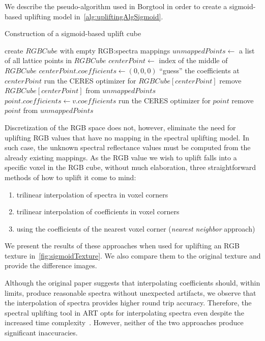 We describe the pseudo-algorithm used in Borgtool in order to create a sigmoid-based uplifting model in~\cref{alg:upliftingAlgSigmoid}.

\begin{algorithm}[t!]
	\caption{Construction of a sigmoid-based uplift cube}
	\label{alg:upliftingAlgSigmoid}
	\begin{algorithmic}[1]
		\State create $RGBCube$ with empty RGB:spectra mappings
		\State $unmappedPoints \gets$ a list of all lattice points in $RGBCube$
		\State $centerPoint \gets$ index of the middle of $RGBCube$
		\Statex {}
		\State $centerPoint.coefficients \gets (0,0,0)$
		\Statex \Comment ``guess'' the coefficients at $centerPoint$
		\State run the CERES optimizer for $RGBCube[centerPoint]$
		\State remove $RGBCube[centerPoint]$ from $unmappedPoints$
		\State $point.coefficients \gets v.coefficients$
		\State run the CERES optimizer for $point$
		\State remove $point$ from $unmappedPoints$
		\EndIf
		\EndIf
		\EndFor
		\EndWhile
	\end{algorithmic}
\end{algorithm}

Discretization of the RGB space does not, however, eliminate the need for uplifting RGB values that have no mapping in the spectral uplifting model. In such case, the unknown spectral reflectance values must be computed from the already existing mappings. As the RGB value we wish to uplift falls into a specific voxel in the RGB cube, without much elaboration, three straightforward methods of how to uplift it come to mind:
\begin{enumerate}
	\item trilinear interpolation of spectra in voxel corners
	\item trilinear interpolation of coefficients in voxel corners
	\item using the coefficients of the nearest voxel corner (\emph{nearest neighbor} approach)
\end{enumerate}

We present the results of these approaches when used for uplifting an RGB texture in~\cref{fig:sigmoidTexture}. We also compare them to the original texture and provide the difference images.

Although the original paper suggests that interpolating coefficients should, within limits, produce reasonable spectra without unexpected artifacts, we observe that the interpolation of spectra provides higher round trip accuracy. Therefore, the spectral uplifting tool in ART opts for interpolating spectra even despite the increased time complexity~\cite{ARTsigmoids}. However, neither of the two approaches produce significant inaccuracies.

